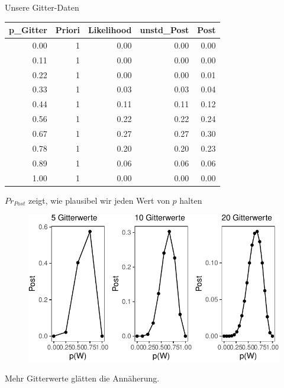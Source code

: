 \documentclass[
  ngerman,
  ignorenonframetext,
]{beamer}
\begin{document}
\begin{frame}{Unsere Gitter-Daten}
\protect\hypertarget{unsere-gitter-daten}{}
\begin{tabular}[t]{r|r|r|r|r}
\hline
p\_Gitter & Priori & Likelihood & unstd\_Post & Post\\
\hline
0.00 & 1 & 0.00 & 0.00 & 0.00\\
\hline
0.11 & 1 & 0.00 & 0.00 & 0.00\\
\hline
0.22 & 1 & 0.00 & 0.00 & 0.01\\
\hline
0.33 & 1 & 0.03 & 0.03 & 0.04\\
\hline
0.44 & 1 & 0.11 & 0.11 & 0.12\\
\hline
0.56 & 1 & 0.22 & 0.22 & 0.24\\
\hline
0.67 & 1 & 0.27 & 0.27 & 0.30\\
\hline
0.78 & 1 & 0.20 & 0.20 & 0.23\\
\hline
0.89 & 1 & 0.06 & 0.06 & 0.06\\
\hline
1.00 & 1 & 0.00 & 0.00 & 0.00\\
\hline
\end{tabular}
\end{frame}

\begin{frame}{\(Pr_{Post}\) zeigt, wie plausibel wir jeden Wert von
\(p\) halten}
\protect\hypertarget{pr_post-zeigt-wie-plausibel-wir-jeden-wert-von-p-halten}{}
\begin{figure}[H]
\includegraphics[width=1\linewidth]{unnamed-chunk-30-1} \end{figure}

Mehr Gitterwerte glätten die Annäherung.
\end{frame}
\end{document}
